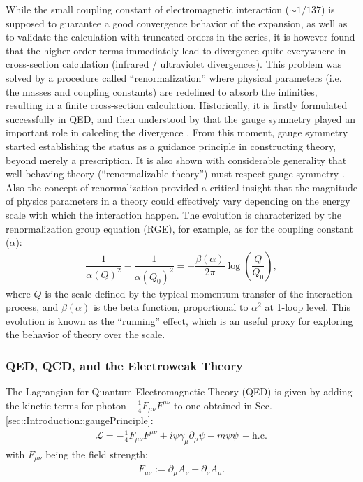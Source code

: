 While the small coupling constant of electromagnetic interaction ($\sim 1/137$) is supposed to guarantee a good convergence behavior of the expansion, as well as to validate the calculation with truncated orders in the series, it is however found that the higher order terms immediately lead to divergence quite everywhere in cross-section calculation (infrared / ultraviolet divergences). This problem was solved by a procedure called ``renormalization'' 
where physical parameters (i.e. the masses and coupling constants) are redefined to absorb the infinities, resulting in a finite cross-section calculation. Historically, it is firstly formulated successfully in QED, and then understood by that the gauge symmetry played an important role in calceling the divergence \cite{Ward1950}\cite{Takahashi1957}. From this moment, gauge symmetry started establishing the status as a guidance principle in constructing theory, beyond merely a prescription. It is also shown with considerable generality that well-behaving theory (``renormalizable theory'') must respect gauge symmetry \cite{tHooft1972}. \\

Also the concept of renormalization provided a critical insight that the magnitude of physics parameters in a theory could effectively vary depending on the energy scale with which the interaction happen. The evolution is characterized by the renormalization group equation (RGE), for example, as for the coupling constant ($\alpha$): 
\begin{align}
\dfrac{1}{\alpha(Q)^2}-\dfrac{1}{\alpha(Q_0)^2} = -\dfrac{\beta(\alpha)}{2\pi} \log{\left(\dfrac{Q}{Q_0}\right)},
\end{align}
where $Q$ is the scale defined by the typical momentum transfer of the interaction process, and $\beta(\alpha)$ is the beta function, proportional to $\alpha^2$ at 1-loop level. This evolution is known as the ``running'' effect, which is an useful proxy for exploring the behavior of theory over the scale. \\


\subsubsection{QED, QCD, and the Electroweak Theory}
The Lagrangian for Quantum Electromagnetic Theory (QED) is given by adding the kinetic terms for photon $-\frac{1}{4}F_{\mu\nu} F^{\mu\nu}$ to one obtained in Sec. \ref{sec::Introduction::gaugePrinciple}:
\begin{align}
\mathcal{L} = -\frac{1}{4}F_{\mu\nu} F^{\mu\nu} + i \bar{\psi} \gamma_\mu \partial_\mu \psi - m \bar{\psi}\psi \, + \mathrm{h.c.}
\end{align}
with $F_{\mu\nu}$ being the field strength:
\begin{align}
F_{\mu\nu} := \partial_\mu A_\nu - \partial_\nu A_\mu.
\end{align}


